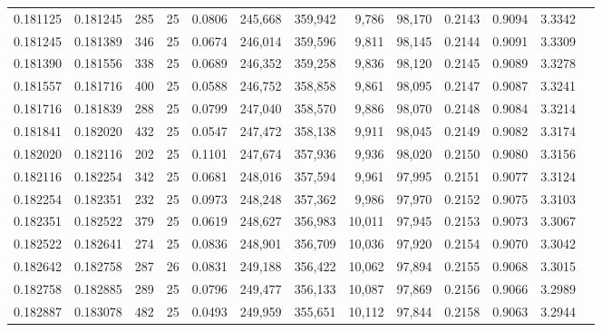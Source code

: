 \begin{tabular}{rrrrrrrrrrrrr}
0.181125 & 0.181245 &   285 &  25 &                                     0.0806 & 245,668 & 359,942 &   9,786 &  98,170 & 0.2143 & 0.9094 & 3.3342 \\
0.181245 & 0.181389 &   346 &  25 &                                     0.0674 & 246,014 & 359,596 &   9,811 &  98,145 & 0.2144 & 0.9091 & 3.3309 \\
0.181390 & 0.181556 &   338 &  25 &                                     0.0689 & 246,352 & 359,258 &   9,836 &  98,120 & 0.2145 & 0.9089 & 3.3278 \\
0.181557 & 0.181716 &   400 &  25 &                                     0.0588 & 246,752 & 358,858 &   9,861 &  98,095 & 0.2147 & 0.9087 & 3.3241 \\
0.181716 & 0.181839 &   288 &  25 &                                     0.0799 & 247,040 & 358,570 &   9,886 &  98,070 & 0.2148 & 0.9084 & 3.3214 \\
0.181841 & 0.182020 &   432 &  25 &                                     0.0547 & 247,472 & 358,138 &   9,911 &  98,045 & 0.2149 & 0.9082 & 3.3174 \\
0.182020 & 0.182116 &   202 &  25 &                                     0.1101 & 247,674 & 357,936 &   9,936 &  98,020 & 0.2150 & 0.9080 & 3.3156 \\
0.182116 & 0.182254 &   342 &  25 &                                     0.0681 & 248,016 & 357,594 &   9,961 &  97,995 & 0.2151 & 0.9077 & 3.3124 \\
0.182254 & 0.182351 &   232 &  25 &                                     0.0973 & 248,248 & 357,362 &   9,986 &  97,970 & 0.2152 & 0.9075 & 3.3103 \\
0.182351 & 0.182522 &   379 &  25 &                                     0.0619 & 248,627 & 356,983 &  10,011 &  97,945 & 0.2153 & 0.9073 & 3.3067 \\
0.182522 & 0.182641 &   274 &  25 &                                     0.0836 & 248,901 & 356,709 &  10,036 &  97,920 & 0.2154 & 0.9070 & 3.3042 \\
0.182642 & 0.182758 &   287 &  26 &                                     0.0831 & 249,188 & 356,422 &  10,062 &  97,894 & 0.2155 & 0.9068 & 3.3015 \\
0.182758 & 0.182885 &   289 &  25 &                                     0.0796 & 249,477 & 356,133 &  10,087 &  97,869 & 0.2156 & 0.9066 & 3.2989 \\
0.182887 & 0.183078 &   482 &  25 &                                     0.0493 & 249,959 & 355,651 &  10,112 &  97,844 & 0.2158 & 0.9063 & 3.2944 \\

\end{tabular}
